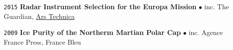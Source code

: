 \begin{itemize}[leftmargin=3.8em, labelsep=1.5em]
    \item[\texttt{2015}] \textbf{Radar Instrument Selection for the Europa Mission} $\bullet$ inc. The Guardian, \href{https://arstechnica.com/science/2015/11/attempt-no-landing-there-yeah-right-were-going-to-europa/}{Ars Technica}
    \item[\texttt{2009}] \textbf{Ice Purity of the Northerm Martian Polar Cap} $\bullet$ inc. Agence France Press, France Bleu
    
\end{itemize}